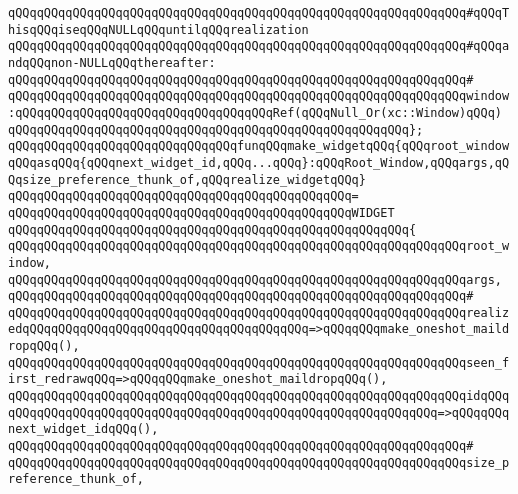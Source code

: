 \verb|qQQqqQQqqQQqqQQqqQQqqQQqqQQqqQQqqQQqqQQqqQQqqQQqqQQqqQQqqQQqqQQq#qQQqThisqQQqiseqQQqNULLqQQquntilqQQqrealization|\newline
\verb|qQQqqQQqqQQqqQQqqQQqqQQqqQQqqQQqqQQqqQQqqQQqqQQqqQQqqQQqqQQqqQQq#qQQqandqQQqnon-NULLqQQqthereafter:|\newline
\verb|qQQqqQQqqQQqqQQqqQQqqQQqqQQqqQQqqQQqqQQqqQQqqQQqqQQqqQQqqQQqqQQq#|\newline
\verb|qQQqqQQqqQQqqQQqqQQqqQQqqQQqqQQqqQQqqQQqqQQqqQQqqQQqqQQqqQQqqQQqwindow:qQQqqQQqqQQqqQQqqQQqqQQqqQQqqQQqqQQqRef(qQQqNull_Or(xc::Window)qQQq)|\newline
\verb|qQQqqQQqqQQqqQQqqQQqqQQqqQQqqQQqqQQqqQQqqQQqqQQqqQQqqQQq};|\newline
\newline
\verb|qQQqqQQqqQQqqQQqqQQqqQQqqQQqqQQqfunqQQqmake_widgetqQQq{qQQqroot_windowqQQqasqQQq{qQQqnext_widget_id,qQQq...qQQq}:qQQqRoot_Window,qQQqargs,qQQqsize_preference_thunk_of,qQQqrealize_widgetqQQq}|\newline
\verb|qQQqqQQqqQQqqQQqqQQqqQQqqQQqqQQqqQQqqQQqqQQqqQQq=|\newline
\verb|qQQqqQQqqQQqqQQqqQQqqQQqqQQqqQQqqQQqqQQqqQQqqQQqWIDGET|\newline
\verb|qQQqqQQqqQQqqQQqqQQqqQQqqQQqqQQqqQQqqQQqqQQqqQQqqQQqqQQq{|\newline
\verb|qQQqqQQqqQQqqQQqqQQqqQQqqQQqqQQqqQQqqQQqqQQqqQQqqQQqqQQqqQQqqQQqroot_window,|\newline
\verb|qQQqqQQqqQQqqQQqqQQqqQQqqQQqqQQqqQQqqQQqqQQqqQQqqQQqqQQqqQQqqQQqargs,|\newline
\verb|qQQqqQQqqQQqqQQqqQQqqQQqqQQqqQQqqQQqqQQqqQQqqQQqqQQqqQQqqQQqqQQq#|\newline
\verb|qQQqqQQqqQQqqQQqqQQqqQQqqQQqqQQqqQQqqQQqqQQqqQQqqQQqqQQqqQQqqQQqrealizedqQQqqQQqqQQqqQQqqQQqqQQqqQQqqQQqqQQqqQQq=>qQQqqQQqmake_oneshot_maildropqQQq(),|\newline
\verb|qQQqqQQqqQQqqQQqqQQqqQQqqQQqqQQqqQQqqQQqqQQqqQQqqQQqqQQqqQQqqQQqseen_first_redrawqQQq=>qQQqqQQqmake_oneshot_maildropqQQq(),|\newline
\verb|qQQqqQQqqQQqqQQqqQQqqQQqqQQqqQQqqQQqqQQqqQQqqQQqqQQqqQQqqQQqqQQqidqQQqqQQqqQQqqQQqqQQqqQQqqQQqqQQqqQQqqQQqqQQqqQQqqQQqqQQqqQQqqQQq=>qQQqqQQqnext_widget_idqQQq(),|\newline
\verb|qQQqqQQqqQQqqQQqqQQqqQQqqQQqqQQqqQQqqQQqqQQqqQQqqQQqqQQqqQQqqQQq#|\newline
\verb|qQQqqQQqqQQqqQQqqQQqqQQqqQQqqQQqqQQqqQQqqQQqqQQqqQQqqQQqqQQqqQQqsize_preference_thunk_of,|\newline
